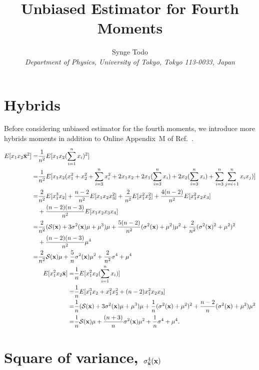 \documentclass[a4paper]{article}
\title{Unbiased Estimator for Fourth Moments}
\author{Synge Todo \\
  {\it Department of Physics, University of Tokyo, Tokyo 113-0033, Japan}}
\newcommand{\ex}[1]{E[ #1 ]}
\newcommand{\xb}{\bar{\bf x}}
\newcommand{\sgm}{\sigma^2({\bf x})}
\newcommand{\ess}{{\cal S}({\bf x})}
\begin{document}
\maketitle

\section{Hybrids}
Before considering unbiased estimator for the fourth moments, we introduce more hybrids moments in addition to Online Appendix~M of Ref.~\cite{Klements2009}.
\begin{align}
  \begin{split}
    \ex{x_1 x_2 \xb^2} =& \frac{1}{n^2} \ex{x_1 x_2 (\sum_{i=1}^n x_i)^2} \\
    =& \frac{1}{n^2} \ex{x_1 x_2 (x_1^2 + x_2^2 + \sum_{i=3}^n x_i^2 + 2 x_1 x_2 + 2 x_1 (\sum_{i=3}^n x_i) + 2 x_2 (\sum_{i=3}^n x_i) + \sum_{i=3}^n\sum_{j=i+1}^n x_i x_j)} \\
    =& \frac{2}{n^2} \ex{x_1^3 x_2} + \frac{n-2}{n^2} \ex{x_1 x_2 x_3^2} + \frac{2}{n^2} \ex{x_1^2 x_2^2} + \frac{4(n-2)}{n^2} \ex{x_1^2 x_2 x_3} \\ &+ \frac{(n-2)(n-3)}{n^2} \ex{x_1 x_2 x_3 x_4} \\
    =& \frac{2}{n^2} (\ess + 3 \sgm \mu + \mu^3) \mu + \frac{5(n-2)}{n^2} (\sgm + \mu^2) \mu^2 + \frac{2}{n^2} (\sgm^2+\mu^2)^2 \\ &+ \frac{(n-2)(n-3)}{n^2} \mu^4 \\
    =& \frac{2}{n^2} \ess \mu + \frac{5}{n} \sgm \mu^2 + \frac{2}{n^2} \sigma^4 + \mu^4
  \end{split} \\
  \begin{split}
    \ex{x_1^2 x_2 \xb} =& \frac{1}{n} \ex{x_1^2 x_2 (\sum_{i=1}^n x_i)} \\
    =& \frac{1}{n} \ex{x_1^3 x_2 + x_1^2 x_2^2 + (n-2) x_1^2 x_2 x_3} \\
    =& \frac{1}{n} (\ess + 3 \sgm \mu + \mu^3) \mu + \frac{1}{n} (\sgm + \mu^2)^2 + \frac{n-2}{n} (\sgm + \mu^2) \mu^2 \\
    =& \frac{1}{n} \ess \mu + \frac{(n+3)}{n} \sgm \mu^2 + \frac{1}{n} \sigma^4 + \mu^4.
  \end{split}
\end{align}

\section{Square of variance, $\sigma_{\xb}^4({\bf x})$}
\end{document}
